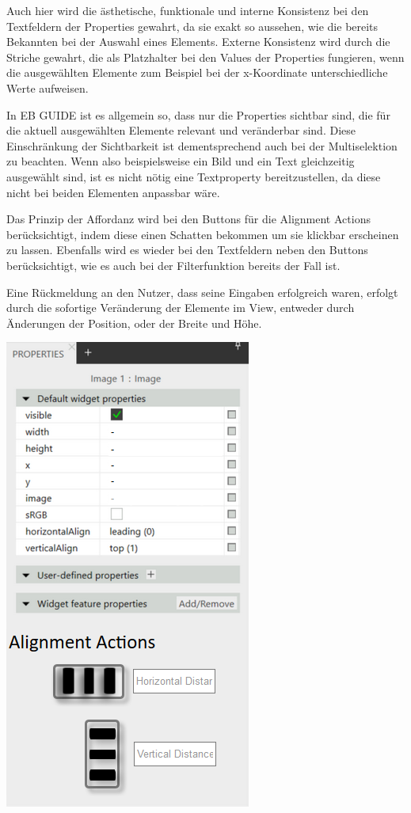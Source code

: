 Auch hier wird die ästhetische, funktionale und interne Konsistenz bei den Textfeldern der Properties gewahrt, da sie exakt so aussehen, wie die bereits Bekannten bei der Auswahl eines Elements.
Externe Konsistenz wird durch die Striche gewahrt, die als Platzhalter bei den Values der Properties fungieren, wenn die ausgewählten Elemente zum Beispiel bei der x-Koordinate unterschiedliche Werte aufweisen.

In EB GUIDE ist es allgemein so, dass nur die Properties sichtbar sind, die für die aktuell ausgewählten Elemente relevant und veränderbar sind.
Diese Einschränkung der Sichtbarkeit ist dementsprechend auch bei der Multiselektion zu beachten.
Wenn also beispielsweise ein Bild und ein Text gleichzeitig ausgewählt sind, ist es nicht nötig eine Textproperty bereitzustellen, da diese nicht bei beiden Elementen anpassbar wäre.

Das Prinzip der Affordanz wird bei den Buttons für die Alignment Actions berücksichtigt, indem diese einen Schatten bekommen um sie klickbar erscheinen zu lassen.
Ebenfalls wird es wieder bei den Textfeldern neben den Buttons berücksichtigt, wie es auch bei der Filterfunktion bereits der Fall ist.

Eine Rückmeldung an den Nutzer, dass seine Eingaben erfolgreich waren, erfolgt durch die sofortige Veränderung der Elemente im View, entweder durch Änderungen der Position, oder der Breite und Höhe.

\begin{center}
  \includegraphics[scale=0.8]{figures/Mehrfachselektion_Adaption02.png}
  \label{fig:Mehrfachselektion_Adaption}
\end{center}

